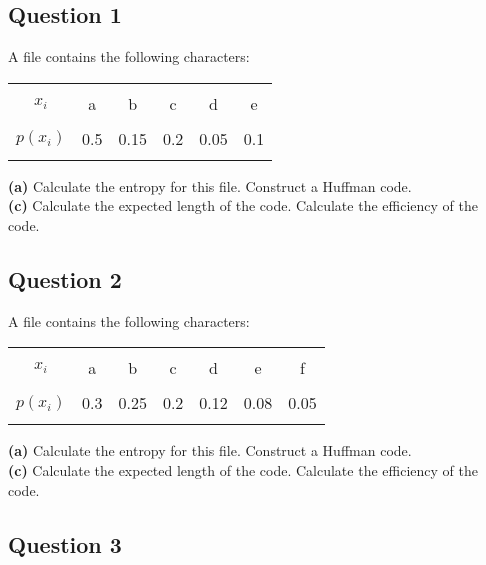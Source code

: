 \documentclass[12pt]{article}
\begin{document}
\subsection*{Question 1}

A file contains the following characters:\\[-0.1cm]
\begin{center}
\begin{tabular}{|c|ccccc|}
\hline
&&&&& \\[-0.4cm]
$x_i$     & a & b & c & d & e \\[0.1cm]
\hline
&&&&& \\[-0.4cm]
$p(x_i)$  & 0.5 & 0.15 & 0.2 & 0.05 & 0.1 \\[0.1cm]
\hline
\multicolumn{6}{c}{}\\[-0.2cm]
\end{tabular}
\end{center}

{\bf(a)} Calculate the entropy for this file.  Construct a Huffman code. \quad \\{\bf(c)} Calculate the expected length of the code.  Calculate the efficiency of the code.



\subsection*{Question 2}

A file contains the following characters:\\[-0.1cm]
\begin{center}
\begin{tabular}{|c|cccccc|}
\hline
&&&&&& \\[-0.4cm]
$x_i$     & a & b & c & d & e & f\\[0.1cm]
\hline
&&&&&& \\[-0.4cm]
$p(x_i)$  & 0.3 & 0.25 & 0.2 & 0.12 & 0.08 & 0.05 \\[0.1cm]
\hline
\multicolumn{7}{c}{}\\[-0.2cm]
\end{tabular}
\end{center}

{\bf(a)} Calculate the entropy for this file.  Construct a Huffman code. \quad \\{\bf(c)} Calculate the expected length of the code.  Calculate the efficiency of the code.


\subsection*{Question 3}
\end{document}
